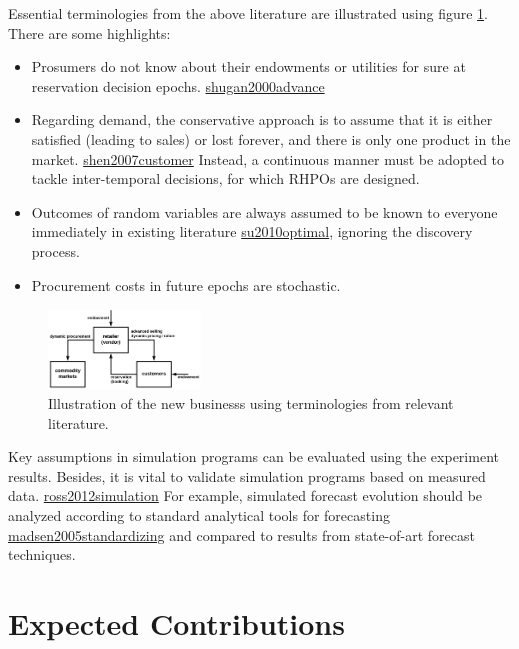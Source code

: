 \documentclass[letterpaper,8pt,twocolumn,twoside,]{pinp}
\providecommand{\tightlist}{%
  \setlength{\itemsep}{0pt}\setlength{\parskip}{0pt}}
\begin{document}
Essential terminologies from the above literature are illustrated using
figure \ref{4}. There are some highlights:

\begin{itemize}
\tightlist
\item
  Prosumers do not know about their endowments or utilities for sure at
  reservation decision epochs.
  \protect\hyperlink{reference}{shugan2000advance}
\item
  Regarding demand, the conservative approach is to assume that it is
  either satisfied (leading to sales) or lost forever, and there is only
  one product in the market.
  \protect\hyperlink{reference}{shen2007customer} Instead, a continuous
  manner must be adopted to tackle inter-temporal decisions, for which
  RHPOs are designed.
\item
  Outcomes of random variables are always assumed to be known to
  everyone immediately in existing literature
  \protect\hyperlink{reference}{su2010optimal}, ignoring the discovery
  process.
\item
  Procurement costs in future epochs are stochastic.
\end{itemize}

\begin{figure}
\begin{center}
  \includegraphics[width=0.36\textwidth]{../../../images/4-12.png}
\end{center}
\caption{Illustration of the new businesss using terminologies from relevant literature.}
\label{4}
\end{figure}

Key assumptions in simulation programs can be evaluated using the
experiment results. Besides, it is vital to validate simulation programs
based on measured data.
\protect\hyperlink{reference}{ross2012simulation} For example, simulated
forecast evolution should be analyzed according to standard analytical
tools for forecasting
\protect\hyperlink{reference}{madsen2005standardizing} and compared to
results from state-of-art forecast techniques.

\hypertarget{expected-contributions}{%
\section{Expected Contributions}\label{expected-contributions}}
\end{document}
